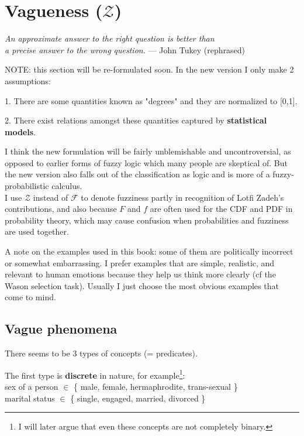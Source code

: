 \chapter{Vagueness ($\mathcal{Z}$)}
\label{ch:vagueness}
\begin{flushright}
\emph{An approximate answer to the right question is better than\\
a precise answer to the wrong question.} --- John Tukey (rephrased)
\end{flushright}
\minitoc

NOTE:  this section will be re-formulated soon.  In the new version I only make 2 assumptions:

1. There are some quantities known as "degrees" and they are normalized to [0,1].

2. There exist relations amongst these quantities captured by \textbf{statistical models}.

I think the new formulation will be fairly unblemishable and uncontroversial, as opposed to earlier forms of fuzzy logic which many people are skeptical of.  But the new version also falls out of the classification as logic and is more of a fuzzy-probabilistic calculus.
\\

\footnotesize
I use $\mathcal{Z}$ instead of $\mathcal{F}$ to denote fuzziness partly in recognition of Lotfi Zadeh's contributions, and also because $F$ and $f$ are often used for the CDF and PDF in probability theory, which may cause confusion when probabilities and fuzziness are used together.

A note on the examples used in this book:  some of them are politically incorrect or somewhat embarrassing.  I prefer examples that are simple, realistic, and relevant to human emotions because they help us think more clearly (cf the Wason selection task).  Usually I just choose the most obvious examples that come to mind.
\normalsize

\section{Vague phenomena}

There seems to be 3 types of concepts (= predicates).

The first type is \textbf{discrete} in nature, for example\footnote{I will later argue that even these concepts are not completely binary.}:\\
\hspace*{1cm} sex of a person $\in$ \{ male, female, hermaphrodite, trans-sexual \}\\
\hspace*{1cm} marital status $\in$ \{ single, engaged, married, divorced \}


